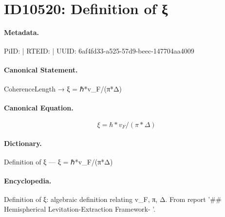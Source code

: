 \section*{ID10520: Definition of ξ}
\paragraph{Metadata.}
PiID:  | RTEID:  | UUID: 6af4fd33-a525-57d9-beec-147704aa4009

\paragraph{Canonical Statement.}
CoherenceLength → ξ = ℏ*v\_F/(π*Δ)

\paragraph{Canonical Equation.}
\[
ξ = ℏ*v_F/(π*Δ)
\]

\paragraph{Dictionary.}
Definition of ξ — ξ = ℏ*v\_F/(π*Δ)

\paragraph{Encyclopedia.}
Definition of ξ: algebraic definition relating v\_F, π, Δ. From report '\#\# Hemispherical Levitation-Extraction Framework- '.
